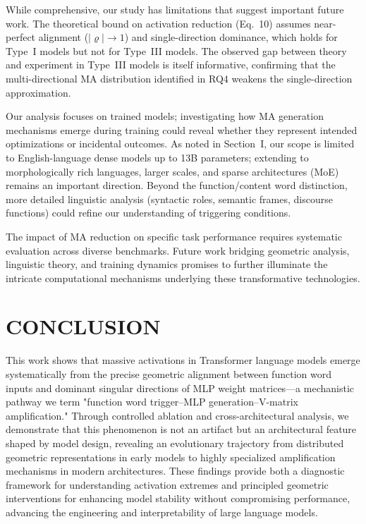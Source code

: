 \documentclass[conference]{IEEEtran}
\begin{document}
While comprehensive, our study has limitations that suggest important future work. The theoretical bound on activation reduction (Eq.~10) assumes near-perfect alignment ($|\varrho| \to 1$) and single-direction dominance, which holds for Type~I models but not for Type~III models. The observed gap between theory and experiment in Type~III models is itself informative, confirming that the multi-directional MA distribution identified in RQ4 weakens the single-direction approximation.

Our analysis focuses on trained models; investigating how MA generation mechanisms emerge during training could reveal whether they represent intended optimizations or incidental outcomes. As noted in Section~I, our scope is limited to English-language dense models up to 13B parameters; extending to morphologically rich languages, larger scales, and sparse architectures (MoE) remains an important direction. Beyond the function/content word distinction, more detailed linguistic analysis (syntactic roles, semantic frames, discourse functions) could refine our understanding of triggering conditions.

The impact of MA reduction on specific task performance requires systematic evaluation across diverse benchmarks. Future work bridging geometric analysis, linguistic theory, and training dynamics promises to further illuminate the intricate computational mechanisms underlying these transformative technologies.

\section{CONCLUSION}

This work shows that massive activations in Transformer language models emerge systematically from the precise geometric alignment between function word inputs and dominant singular directions of MLP weight matrices—a mechanistic pathway we term "function word trigger–MLP generation–V-matrix amplification." Through controlled ablation and cross-architectural analysis, we demonstrate that this phenomenon is not an artifact but an architectural feature shaped by model design, revealing an evolutionary trajectory from distributed geometric representations in early models to highly specialized amplification mechanisms in modern architectures. These findings provide both a diagnostic framework for understanding activation extremes and principled geometric interventions for enhancing model stability without compromising performance, advancing the engineering and interpretability of large language models.
\end{document}
